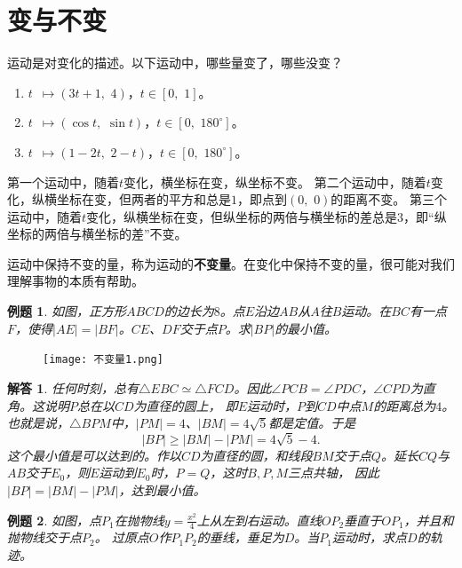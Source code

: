 \documentclass[12pt,UTF8]{ctexbook}
\newtheorem{et}{例题}[section]
\newtheorem*{so}{解答}
\begin{document}
\section{变与不变}
运动是对变化的描述。以下运动中，哪些量变了，哪些没变？
\begin{enumerate}
    \item $ t \,\,\,\mapsto (3t+1, \,\, 4)$，$t\in[0,\,\,1]$。
    \item $ t \,\,\,\mapsto (\cos{t}, \,\, \sin{t})$，$t\in[0,\,\,180^\circ]$。
    \item $ t \,\,\,\mapsto (1 - 2t, \,\, 2 - t)$，$t\in[0,\,\,180^\circ]$。
\end{enumerate}
第一个运动中，随着$t$变化，横坐标在变，纵坐标不变。
第二个运动中，随着$t$变化，纵横坐标在变，但两者的平方和总是$1$，即点到$(0,\,\,0)$的距离不变。
第三个运动中，随着$t$变化，纵横坐标在变，但纵坐标的两倍与横坐标的差总是$3$，即“纵坐标的两倍与横坐标的差”不变。

运动中保持不变的量，称为运动的\textbf{不变量}。在变化中保持不变的量，很可能对我们理解事物的本质有帮助。

\begin{et}
    如图，正方形$ABCD$的边长为$8$。点$E$沿边$AB$从$A$往$B$运动。在$BC$有一点$F$，使得$|AE| = |BF|$。$CE$、$DF$交于点$P$。求$|BP|$的最小值。
\end{et}

\begin{figure}[H] %
    \vspace{4pt}
    \centering
    \texttt{[image: 不变量1.png]}
\end{figure}

\begin{so}
    任何时刻，总有$\triangle EBC \simeq \triangle FCD$。因此$\angle PCB = \angle PDC$，$\angle CPD$为直角。这说明$P$总在以$CD$为直径的圆上，
    即$E$运动时，$P$到$CD$中点$M$的距离总为$4$。也就是说，$\triangle BPM$中，$|PM| = 4$、$|BM| = 4\sqrt{5}$都是定值。于是
    $$ |BP| \geqslant |BM| - |PM| = 4\sqrt{5} - 4.$$
    这个最小值是可以达到的。作以$CD$为直径的圆，和线段$BM$交于点$Q$。延长$CQ$与$AB$交于$E_0$，则$E$运动到$E_0$时，$P=Q$，这时$B,P,M$三点共轴，
    因此$|BP| = |BM| - |PM|$，达到最小值。
\end{so}

\begin{et}
    如图，点$P_1$在抛物线$y = \frac{x^2}{4}$上从左到右运动。直线$OP_2$垂直于$OP_1$，并且和抛物线交于点$P_2$。
    过原点$O$作$P_1P_2$的垂线，垂足为$D$。当$P_1$运动时，求点$D$的轨迹。
\end{et}
\end{document}
